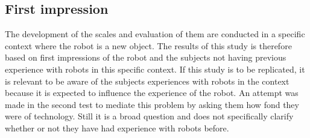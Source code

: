 \subsection{First impression}

The development of the scales and evaluation of them are conducted in a specific context where the robot is a new object. The results of this study is therefore based on first impressions of the robot and the subjects not having previous experience with robots in this specific context. If this study is to be replicated, it is relevant to be aware of the subjects experiences with robots in the context because it is expected to influence the experience of the robot. 
An attempt was made in the second test to mediate this problem by asking them how fond they were of technology. Still it is a broad question and does not specifically clarify whether or not they have had experience with robots before.
